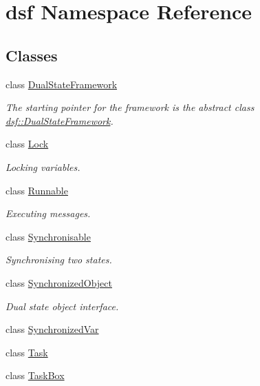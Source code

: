 \hypertarget{namespacedsf}{}\section{dsf Namespace Reference}
\label{namespacedsf}
\subsection*{Classes}
\begin{DoxyCompactItemize}
\item 
class \hyperlink{classdsf_1_1_dual_state_framework}{Dual\+State\+Framework}
\begin{DoxyCompactList}\small\item\em The starting pointer for the framework is the abstract class \hyperlink{classdsf_1_1_dual_state_framework}{dsf\+::\+Dual\+State\+Framework}. \end{DoxyCompactList}\item 
class \hyperlink{classdsf_1_1_lock}{Lock}
\begin{DoxyCompactList}\small\item\em Locking variables. \end{DoxyCompactList}\item 
class \hyperlink{classdsf_1_1_runnable}{Runnable}
\begin{DoxyCompactList}\small\item\em Executing messages. \end{DoxyCompactList}\item 
class \hyperlink{classdsf_1_1_synchronisable}{Synchronisable}
\begin{DoxyCompactList}\small\item\em Synchronising two states. \end{DoxyCompactList}\item 
class \hyperlink{classdsf_1_1_synchronized_object}{Synchronized\+Object}
\begin{DoxyCompactList}\small\item\em Dual state object interface. \end{DoxyCompactList}\item 
class \hyperlink{classdsf_1_1_synchronized_var}{Synchronized\+Var}
\item 
class \hyperlink{classdsf_1_1_task}{Task}
\item 
class \hyperlink{classdsf_1_1_task_box}{Task\+Box}
\end{DoxyCompactItemize}
